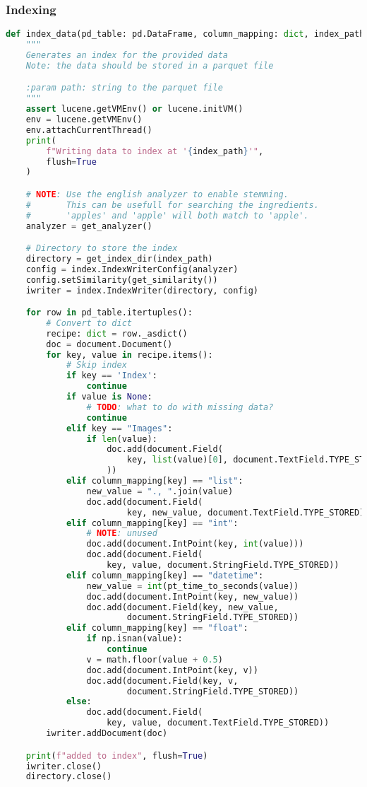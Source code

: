 \documentclass{article}
\begin{document}
\subsubsection{Indexing}
\begin{lstlisting}[language=Python]
def index_data(pd_table: pd.DataFrame, column_mapping: dict, index_path: str):
    """
    Generates an index for the provided data
    Note: the data should be stored in a parquet file

    :param path: string to the parquet file
    """
    assert lucene.getVMEnv() or lucene.initVM()
    env = lucene.getVMEnv()
    env.attachCurrentThread()
    print(
        f"Writing data to index at '{index_path}'",
        flush=True
    )

    # NOTE: Use the english analyzer to enable stemming.
    #       This can be usefull for searching the ingredients.
    #       'apples' and 'apple' will both match to 'apple'.
    analyzer = get_analyzer()

    # Directory to store the index
    directory = get_index_dir(index_path)
    config = index.IndexWriterConfig(analyzer)
    config.setSimilarity(get_similarity())
    iwriter = index.IndexWriter(directory, config)

    for row in pd_table.itertuples():
        # Convert to dict
        recipe: dict = row._asdict()
        doc = document.Document()
        for key, value in recipe.items():
            # Skip index
            if key == 'Index':
                continue
            if value is None:
                # TODO: what to do with missing data?
                continue
            elif key == "Images":
                if len(value):
                    doc.add(document.Field(
                        key, list(value)[0], document.TextField.TYPE_STORED
                    ))
            elif column_mapping[key] == "list":
                new_value = "., ".join(value)
                doc.add(document.Field(
                        key, new_value, document.TextField.TYPE_STORED))
            elif column_mapping[key] == "int":
                # NOTE: unused
                doc.add(document.IntPoint(key, int(value)))
                doc.add(document.Field(
                    key, value, document.StringField.TYPE_STORED))
            elif column_mapping[key] == "datetime":
                new_value = int(pt_time_to_seconds(value))
                doc.add(document.IntPoint(key, new_value))
                doc.add(document.Field(key, new_value,
                        document.StringField.TYPE_STORED))
            elif column_mapping[key] == "float":
                if np.isnan(value):
                    continue
                v = math.floor(value + 0.5)
                doc.add(document.IntPoint(key, v))
                doc.add(document.Field(key, v,
                        document.StringField.TYPE_STORED))
            else:
                doc.add(document.Field(
                    key, value, document.TextField.TYPE_STORED))
        iwriter.addDocument(doc)

    print(f"added to index", flush=True)
    iwriter.close()
    directory.close()

\end{lstlisting}
\end{document}
